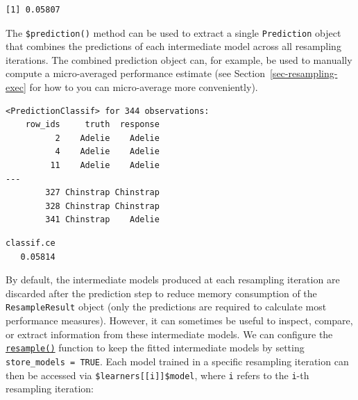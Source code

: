 \begin{Shaded}
\begin{Highlighting}[]
\NormalTok{(}\SpecialCharTok{$}\NormalTok{()))}
\end{Highlighting}
\end{Shaded}

\begin{verbatim}
[1] 0.05807
\end{verbatim}

The \texttt{\$prediction()} method can be used to extract a single
\texttt{Prediction} object that combines the predictions of each
intermediate model across all resampling iterations. The combined
prediction object can, for example, be used to manually compute a
micro-averaged performance estimate (see
Section~\ref{sec-resampling-exec} for how to you can micro-average more
conveniently).

\begin{Shaded}
\begin{Highlighting}[]
\OtherTok{=}\SpecialCharTok{$}\NormalTok{()}
\end{Highlighting}
\end{Shaded}

\begin{verbatim}
<PredictionClassif> for 344 observations:
    row_ids     truth  response
          2    Adelie    Adelie
          4    Adelie    Adelie
         11    Adelie    Adelie
---                            
        327 Chinstrap Chinstrap
        328 Chinstrap Chinstrap
        341 Chinstrap    Adelie
\end{verbatim}

\begin{Shaded}
\begin{Highlighting}[]
\SpecialCharTok{$}\NormalTok{()}
\end{Highlighting}
\end{Shaded}

\begin{verbatim}
classif.ce 
   0.05814 
\end{verbatim}

By default, the intermediate models produced at each resampling
iteration are discarded after the prediction step to reduce memory
consumption of the \texttt{ResampleResult} object (only the predictions
are required to calculate most performance measures). However, it can
sometimes be useful to inspect, compare, or extract information from
these intermediate models. We can configure the
\href{https://mlr3.mlr-org.com/reference/resample.html}{\texttt{resample()}}
function to keep the fitted intermediate models by setting
\texttt{store\_models\ =\ TRUE}. Each model trained in a specific
resampling iteration can then be accessed via
\texttt{\$learners{[}{[}i{]}{]}\$model}, where \texttt{i} refers to the
\texttt{i}-th resampling iteration:

